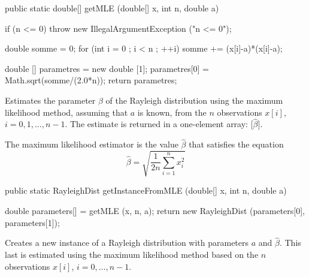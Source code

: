 \begin{code}

   public static double[] getMLE (double[] x, int n, double a)\begin{hide} {
      if (n <= 0)
         throw new IllegalArgumentException ("n <= 0");

      double somme = 0;
      for (int i = 0 ; i < n ; ++i) somme += (x[i]-a)*(x[i]-a);

      double [] parametres = new double [1];
      parametres[0] = Math.sqrt(somme/(2.0*n));
      return parametres;
   }\end{hide}
\end{code}
\begin{tabb}
   Estimates the parameter $\beta$ of the Rayleigh distribution
   using the maximum likelihood method, assuming that $a$ is known,
   from the $n$ observations $x[i]$, $i = 0, 1, \ldots, n-1$.
   The estimate is returned in a one-element array: [$\hat\beta$].
   \begin{detailed}
   The maximum likelihood estimator is the value
   $\hat{\beta}$ that satisfies the equation
  $$
      \hat{\beta}  = \sqrt{\frac1{2n}\sum_{i=1}^{n} x_i^2}
  $$
   \end{detailed}
\end{tabb}
\begin{htmlonly}
\end{htmlonly}
\begin{code}

   public static RayleighDist getInstanceFromMLE (double[] x, int n,
                                                  double a)\begin{hide} {
      double parameters[] = getMLE (x, n, a);
      return new RayleighDist (parameters[0], parameters[1]);
   }\end{hide}
\end{code}
\begin{tabb}
   Creates a new instance of a Rayleigh distribution with parameters $a$ and
   $\hat\beta$. This last is estimated using the maximum likelihood method 
   based on the $n$ observations $x[i]$, $i = 0, \ldots, n-1$.
\end{tabb}
\begin{htmlonly}
\end{htmlonly}
